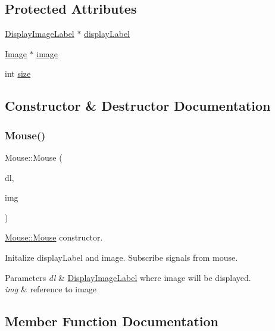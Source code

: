 \subsection*{Protected Attributes}
\begin{DoxyCompactItemize}
\item 
\mbox{\hyperlink{class_display_image_label}{Display\+Image\+Label}} $\ast$ \mbox{\hyperlink{class_mouse_a24d49b322c8d63c9805975b316753999}{display\+Label}}
\item 
\mbox{\hyperlink{class_image}{Image}} $\ast$ \mbox{\hyperlink{class_mouse_ac4431c10f6f337649de7cc643d8d01fc}{image}}
\item 
int \mbox{\hyperlink{class_mouse_ad6bd34e208f4050da3e1fd4e0cfcea62}{size}}
\end{DoxyCompactItemize}


\subsection{Constructor \& Destructor Documentation}
\mbox{\label{class_mouse_a0b9f53479872fe8bb342632d354fb46e}} 
\subsubsection{\texorpdfstring{Mouse()}{Mouse()}}
{\footnotesize\ttfamily Mouse\+::\+Mouse (\begin{DoxyParamCaption}\item[{\mbox{\hyperlink{class_display_image_label}{Display\+Image\+Label}} $\ast$}]{dl,  }\item[{\mbox{\hyperlink{class_image}{Image}} $\ast$}]{img }\end{DoxyParamCaption})}



\mbox{\hyperlink{class_mouse_a0b9f53479872fe8bb342632d354fb46e}{Mouse\+::\+Mouse}} constructor. 

Initalize display\+Label and image. Subscribe signals from mouse. 
\begin{DoxyParams}{Parameters}
{\em dl} & \mbox{\hyperlink{class_display_image_label}{Display\+Image\+Label}} where image will be displayed. \\
\hline
{\em img} & reference to image \\
\hline
\end{DoxyParams}


\subsection{Member Function Documentation}
\mbox{\label{class_mouse_ad1e0ab2dbcf1172d7969b50b8a770060}} 
